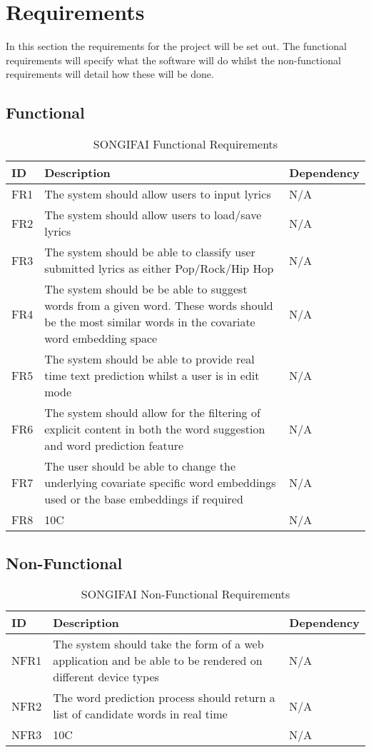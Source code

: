\section{Requirements}
In this section the requirements for the project will be set out. The functional requirements will specify what the software will do whilst the non-functional requirements will detail how these will be done.

\subsection{Functional}
\begin{table}[ht]
	\caption{SONGIFAI Functional Requirements}
	\centering
	\begin{tabular}{ | l | p{10cm} | l | }
		\hline
		\textbf{ID} & \textbf{Description} & \textbf{Dependency} \\ \hline
		FR1 & The system should allow users to input lyrics & N/A \\ \hline
		FR2 & The system should allow users to load/save lyrics & N/A  \\ \hline
		FR3 & The system should be able to classify user submitted lyrics as either Pop/Rock/Hip Hop & N/A \\ \hline
		FR4 & The system should be be able to suggest words from a given word. These words should be the most similar words in the covariate word embedding space & N/A \\ \hline
		FR5 & The system should be able to provide real time text prediction whilst a user is in edit mode & N/A \\ \hline
		FR6 & The system should allow for the filtering of explicit content in both the word suggestion and word prediction feature & N/A \\ \hline
		FR7 & The user should be able to change the underlying covariate specific word embeddings used or the base embeddings if required & N/A \\ \hline
		FR8 & 10C & N/A \\ \hline
	\end{tabular}
	\label{Tab:Tcru}
\end{table}
\subsection{Non-Functional}
\begin{table}[ht]
\caption{SONGIFAI Non-Functional Requirements}
\centering
	\begin{tabular}{ | l | p{10cm} | l | }
		\hline
		\textbf{ID} & \textbf{Description} & \textbf{Dependency} \\ \hline
		NFR1 & The system should take the form of a web application and be able to be rendered on different device types & N/A \\ \hline
		NFR2 & The word prediction process should return a list of candidate words in real time & N/A \\ \hline
		NFR3 & 10C & N/A \\ \hline
	\end{tabular}
	\label{Tab:Tcr}
\end{table}



